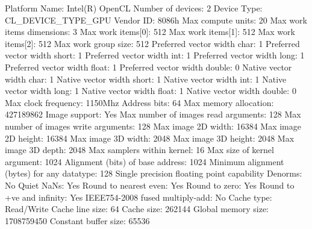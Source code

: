 \begin{codebox}[text]
  Platform Name:                                 Intel(R) OpenCL
Number of devices:                               2
  Device Type:                                   CL_DEVICE_TYPE_GPU
  Vendor ID:                                     8086h
  Max compute units:                             20
  Max work items dimensions:                     3
    Max work items[0]:                           512
    Max work items[1]:                           512
    Max work items[2]:                           512
  Max work group size:                           512
  Preferred vector width char:                   1
  Preferred vector width short:                  1
  Preferred vector width int:                    1
  Preferred vector width long:                   1
  Preferred vector width float:                  1
  Preferred vector width double:                 0
  Native vector width char:                      1
  Native vector width short:                     1
  Native vector width int:                       1
  Native vector width long:                      1
  Native vector width float:                     1
  Native vector width double:                    0
  Max clock frequency:                           1150Mhz
  Address bits:                                  64
  Max memory allocation:                         427189862
  Image support:                                 Yes
  Max number of images read arguments:           128
  Max number of images write arguments:          128
  Max image 2D width:                            16384
  Max image 2D height:                           16384
  Max image 3D width:                            2048
  Max image 3D height:                           2048
  Max image 3D depth:                            2048
  Max samplers within kernel:                    16
  Max size of kernel argument:                   1024
  Alignment (bits) of base address:              1024
  Minimum alignment (bytes) for any datatype:    128
  Single precision floating point capability
    Denorms:                                     No
    Quiet NaNs:                                  Yes
    Round to nearest even:                       Yes
    Round to zero:                               Yes
    Round to +ve and infinity:                   Yes
    IEEE754-2008 fused multiply-add:             No
  Cache type:                                    Read/Write
  Cache line size:                               64
  Cache size:                                    262144
  Global memory size:                            1708759450
  Constant buffer size:                          65536

\end{codebox}
